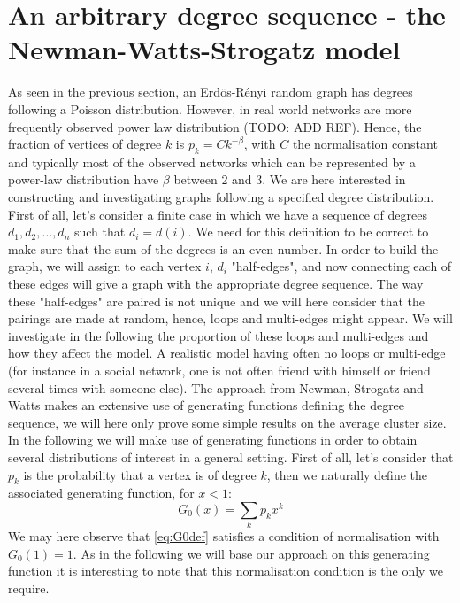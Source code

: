 \section{An arbitrary degree sequence - the Newman-Watts-Strogatz model}
As seen in the previous section, an Erd\"os-R\'enyi random graph has degrees following a Poisson distribution. 
However, in real world networks are more frequently observed power law distribution (TODO: ADD REF).
Hence, the fraction of vertices of degree $k$ is $p_k = Ck^{-\beta}$, with $C$ the normalisation constant and typically most of the observed networks which can be represented by a power-law distribution have $\beta$ between 2 and 3.
We are here interested in constructing and investigating graphs following a specified degree distribution.
\newline
First of all, let's consider a finite case in which we have a sequence of degrees $d_1, d_2, \ldots, d_n$ such that $d_i = d(i)$.
We need for this definition to be correct to make sure that the sum of the degrees is an even number.
In order to build the graph, we will assign to each vertex $i$, $d_i$ "half-edges", and now connecting each of these edges will give a graph with the appropriate degree sequence.
The way these "half-edges" are paired is not unique and we will here consider that the pairings are made at random, hence, loops and multi-edges might appear.
We will investigate in the following the proportion of these loops and multi-edges and how they affect the model. 
A realistic model having often no loops or multi-edge (for instance in a social network, one is not often friend with himself or friend several times with someone else).
\newline
The approach from Newman, Strogatz and Watts makes an extensive use of generating functions defining the degree sequence, we will here only prove some simple results on the average cluster size.
In the following we will make use of generating functions in order to obtain several distributions of interest in a general setting. 
First of all, let's consider that $p_k$ is the probability that a vertex is of degree $k$, then we naturally define the associated generating function, for $x<1$:
\begin{equation}\label{eq:G0def}
	G_0(x) = \sum_k p_k x^k
\end{equation}
We may here observe that \eqref{eq:G0def} satisfies a condition of normalisation with $G_0(1) = 1$.
As in the following we will base our approach on this generating function it is interesting to note that this normalisation condition is the only we require.
